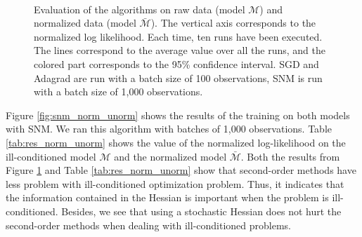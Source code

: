 \documentclass[conference]{IEEEtran}
\begin{document}
\begin{figure}[t]
\vspace{-0.5cm}
    \centering
    ~
    ~
    \vspace{-0.2cm}
    \caption{Evaluation of the algorithms on raw data (model $\mathcal{M}$) and normalized data (model $\bar{\mathcal{M}}$). The vertical axis corresponds to the normalized log likelihood. Each time, ten runs have been executed. The lines correspond to the average value over all the runs, and the colored part corresponds to the 95\% confidence interval. SGD and Adagrad are run with a batch size of 100 observations, SNM is run with a batch size of 1,000 observations.}
    \label{fig:norm_unorm}
    \vspace{-0.5cm}
\end{figure}

Figure \ref{fig:snm_norm_unorm} shows the results of the training on both models with SNM. We ran this algorithm with batches of 1,000 observations. Table \ref{tab:res_norm_unorm} shows the value of the normalized log-likelihood on the ill-conditioned model $\mathcal{M}$ and the normalized model $\bar{\mathcal{M}}$. Both the results from Figure \ref{fig:norm_unorm} and Table \ref{tab:res_norm_unorm} show that second-order methods have less problem with ill-conditioned optimization problem. Thus, it indicates that the information contained in the Hessian is important when the problem is ill-conditioned. Besides, we see that using a stochastic Hessian does not hurt the second-order methods when dealing with ill-conditioned problems.
\end{document}
